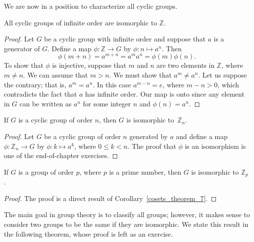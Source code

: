 \medskip

We are now in a position to characterize all cyclic groups.

\begin{theorem}\label{isomorph_theorem_2}
All cyclic groups of infinite order are isomorphic to ${\mathbb Z}$.
\end{theorem}

\begin{proof}
Let $G$ be a cyclic group with infinite order and suppose that $a$ is a generator of $G$.  Define a map $\phi : {\mathbb Z} \rightarrow  G$ by $\phi : n \mapsto a^n$. Then 
$$
\phi( m+n ) = a^{m+n} = a^m a^n = \phi( m ) \phi( n ).
$$
To show that $\phi$ is injective, suppose that $m$ and $n$ are two elements in ${\mathbb Z}$, where $m \neq n$.  We can assume that $m > n$.  We must show that $a^m \neq a^n$. Let us suppose the contrary; that is, $a^m = a^n$. In this case $a^{m - n} = e$, where $m - n>0$, which contradicts the fact that $a$ has infinite order.  Our map is onto since any element in $G$ can be written as $a^n$ for some integer $n$ and $\phi(n) = a^n$.   
\end{proof}

\begin{theorem}\label{isomorph_theorem_3}
If $G$ is a cyclic group of order $n$, then $G$ is isomorphic to~${\mathbb Z}_n$.  
\end{theorem}
 
\begin{proof}
Let $G$ be a cyclic group of order $n$ generated by $a$ and define a map $\phi : {\mathbb Z}_n \rightarrow  G$ by $\phi : k \mapsto a^k$, where $0 \leq k < n$. The proof that $\phi$ is an isomorphism is one of the end-of-chapter exercises. 
\end{proof}

\begin{corollary}\label{isomorph_theorem_4}
If $G$ is a  group of order $p$, where $p$ is a prime number, then $G$ is isomorphic to ${\mathbb Z}_p$. 
\end{corollary}

\begin{proof}
The proof is a direct result of Corollary~\ref{cosets_theorem_7}.
\end{proof}
 
\medskip
 
The main goal in group theory is to classify all groups; however, it makes sense to consider two groups to be the same if they are isomorphic.  We state this result in the following theorem, whose proof is left as an exercise. 

